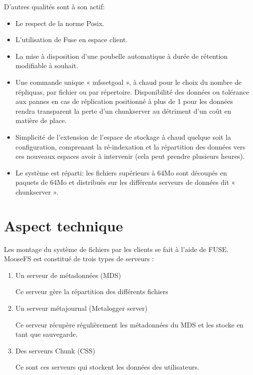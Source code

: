 \documentclass[12pt]{report}
\begin{document}
			D'autres qualités sont à son actif:
			\begin{itemize}
                          \item Le respect de la norme Posix.
			  \item L'utilisation de Fuse en espace client.
			  \item La mise à disposition d'une poubelle automatique à durée de rétention modifiable à souhait.
			  \item Une commande unique « mfssetgoal », à chaud pour le choix du nombre de répliquas, par fichier ou par répertoire. Disponibilité des données ou tolérance aux pannes en cas de réplication positionné à plus de 1 pour les données rendra transparent la perte d'un chunkserver au détriment d'un coût en matière de place.
			  \item Simplicité de l'extension de l'espace de stockage à chaud quelque soit la configuration, comprenant la ré-indexation et la répartition des données vers ces nouveaux espaces avoir à intervenir (cela peut prendre plusieurs heures).
			  \item Le système est réparti: les fichiers supérieurs à 64Mo sont découpés en paquets de 64Mo et distribués sur les différents serveurs de données dit « chunkserver ».
                        \end{itemize}

			\section{Aspect technique}
				
				Les montage du système de fichiers par les clients se fait à l'aide de FUSE.
				MooseFS est constitué de trois types de serveurs :

				\begin{enumerate}
					\item Un serveur de métadonnées (MDS)

					Ce serveur gère la répartition des différents fichiers
					\item Un serveur métajournal (Metalogger server)

					Ce serveur récupère régulièrement les métadonnées du MDS et les stocke en tant que sauvegarde.
					\item Des serveurs Chunk (CSS) %

					Ce sont ces serveurs qui stockent les données des utilisateurs.
				\end{enumerate}
				
\end{document}
